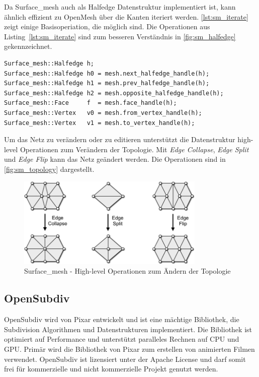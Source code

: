 Da Surface\_mesh auch als Halfedge Datenstruktur implementiert ist, kann ähnlich effizient zu OpenMesh über die Kanten iteriert werden.
\autoref{lst:sm_iterate} zeigt einige Basisoperiation, die möglich sind.
Die Operationen aus Listing~\ref{lst:sm_iterate} sind zum besseren Verständnis in \autoref{fig:sm_halfedge} gekennzeichnet. 

\begin{lstlisting}[style=myCppStyle, caption=Surface\_mesh - Basisoperationen, label=lst:sm_iterate]
Surface_mesh::Halfedge h;
Surface_mesh::Halfedge h0 = mesh.next_halfedge_handle(h);
Surface_mesh::Halfedge h1 = mesh.prev_halfedge_handle(h);
Surface_mesh::Halfedge h2 = mesh.opposite_halfedge_handle(h);
Surface_mesh::Face     f  = mesh.face_handle(h);
Surface_mesh::Vertex   v0 = mesh.from_vertex_handle(h);
Surface_mesh::Vertex   v1 = mesh.to_vertex_handle(h);
\end{lstlisting}

Um das Netz zu verändern oder zu editieren unterstützt die Datenstruktur high-level Operationen zum Verändern der Topologie.
Mit \emph{Edge Collapse}, \emph{Edge Split} und \emph{Edge Flip} kann das Netz geändert werden.
Die Operationen sind in \autoref{fig:sm_topology} dargestellt. 

\begin{figure}
    \centering
  \includegraphics[width=0.8\textwidth]{content/media/sm_topology-changes}
  \caption{Surface\_mesh - High-level Operationen zum Ändern der Topologie \cite{OpenGP.24.07.2015}}
  \label{fig:sm_topology}
\end{figure}

\subsection{OpenSubdiv}

OpenSubdiv wird von Pixar entwickelt und ist eine mächtige Bibliothek, die Subdivision Algorithmen und Datenstrukturen implementiert.
Die Bibliothek ist optimiert auf Performance und unterstützt paralleles Rechnen auf CPU und GPU.
Primär wird die Bibliothek von Pixar zum erstellen von animierten Filmen verwendet.
OpenSubdiv ist lizensiert unter der Apache License und darf somit frei für kommerzielle und nicht kommerzielle Projekt genutzt werden.


